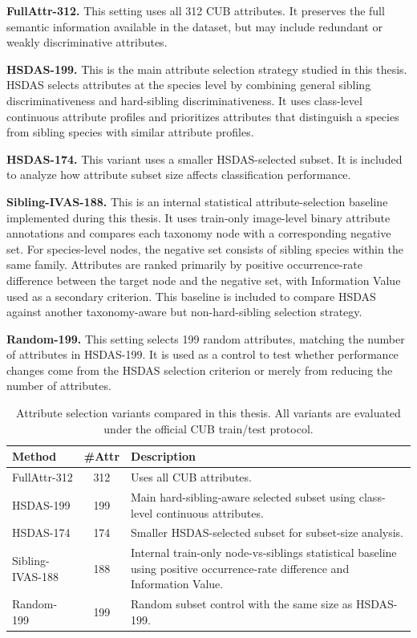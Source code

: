 \textbf{FullAttr-312.} This setting uses all 312 CUB attributes. It preserves the full semantic information available in the dataset, but may include redundant or weakly discriminative attributes.

\textbf{HSDAS-199.} This is the main attribute selection strategy studied in this thesis. HSDAS selects attributes at the species level by combining general sibling discriminativeness and hard-sibling discriminativeness. It uses class-level continuous attribute profiles and prioritizes attributes that distinguish a species from sibling species with similar attribute profiles.

\textbf{HSDAS-174.} This variant uses a smaller HSDAS-selected subset. It is included to analyze how attribute subset size affects classification performance.

\textbf{Sibling-IVAS-188.} This is an internal statistical attribute-selection baseline implemented during this thesis. It uses train-only image-level binary attribute annotations and compares each taxonomy node with a corresponding negative set. For species-level nodes, the negative set consists of sibling species within the same family. Attributes are ranked primarily by positive occurrence-rate difference between the target node and the negative set, with Information Value used as a secondary criterion. This baseline is included to compare HSDAS against another taxonomy-aware but non-hard-sibling selection strategy.

\textbf{Random-199.} This setting selects 199 random attributes, matching the number of attributes in HSDAS-199. It is used as a control to test whether performance changes come from the HSDAS selection criterion or merely from reducing the number of attributes.

\begin{table}[t]
    \centering
    \caption{Attribute selection variants compared in this thesis. All variants are evaluated under the official CUB train/test protocol.}
    \label{tab:attr_selection_variants}
    \begin{tabular}{l c p{8cm}}
        \hline
        \textbf{Method} & \textbf{\#Attr} & \textbf{Description} \\
        \hline
        FullAttr-312 & 312 & Uses all CUB attributes. \\
        HSDAS-199 & 199 & Main hard-sibling-aware selected subset using class-level continuous attributes. \\
        HSDAS-174 & 174 & Smaller HSDAS-selected subset for subset-size analysis. \\
        Sibling-IVAS-188 & 188 & Internal train-only node-vs-siblings statistical baseline using positive occurrence-rate difference and Information Value. \\
        Random-199 & 199 & Random subset control with the same size as HSDAS-199. \\
        \hline
    \end{tabular}
\end{table}







